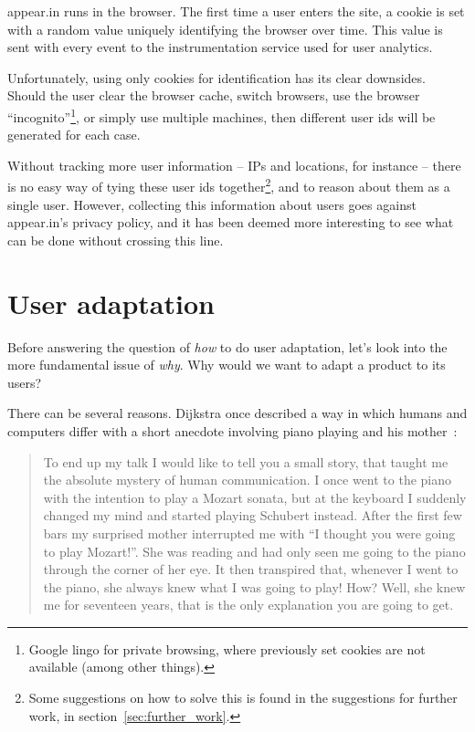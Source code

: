 appear.in runs in the browser. The first time a user enters the site, a cookie is set with a random value uniquely identifying the browser over time. This value is sent with every event to the instrumentation service used for user analytics.

Unfortunately, using only cookies for identification has its clear downsides. Should the user clear the browser cache, switch browsers, use the browser ``incognito''\footnote{Google lingo for private browsing, where previously set cookies are not available (among other things).}, or simply use multiple machines, then different user ids will be generated for each case.

Without tracking more user information -- IPs and locations, for instance -- there is no easy way of tying these user ids together\footnote{Some suggestions on how to solve this is found in the suggestions for further work, in section~\ref{sec:further_work}.}, and to reason about them as a single user. However, collecting this information about users goes against appear.in's privacy policy, and it has been deemed more interesting to see what can be done without crossing this line.

\section{User adaptation}
\label{sec:adaptation_intro}

Before answering the question of \emph{how} to do user adaptation, let's look into the more fundamental issue of \emph{why}. Why would we want to adapt a product to its users?

There can be several reasons. Dijkstra once described a way in which humans and computers differ with a short anecdote involving piano playing and his mother~\cite{Dijkstra1982}:

\begin{quote}
    To end up my talk I would like to tell you a small story, that taught me the absolute mystery of human communication. I once went to the piano with the intention to play a Mozart sonata, but at the keyboard I suddenly changed my mind and started playing Schubert instead. After the first few bars my surprised mother interrupted me with ``I thought you were going to play Mozart!''. She was reading and had only seen me going to the piano through the corner of her eye. It then transpired that, whenever I went to the piano, she always knew what I was going to play! How? Well, she knew me for seventeen years, that is the only explanation you are going to get.
\end{quote}

